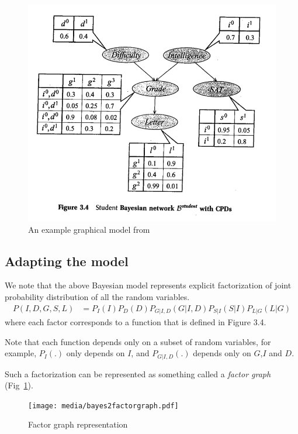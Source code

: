 \documentclass[12pt,oneside,letterpaper]{article}
\begin{document}
\begin{figure}[h]
\includegraphics[width=\textwidth]{media/examplebayesnet.png}
\caption{An example graphical model from \cite[p 53]{koller2009probabilistic}}
\end{figure}

\subsection{Adapting the model}
We note that the above Bayesian model represents explicit factorization of
joint probability distribution of all the random variables.
\begin{align}
  P(I, D, G, S, L) &= P_I(I)P_D(D)P_{G|I,D}(G|I, D)P_{S|I}(S|I)P_{L|G}(L|G)
\end{align}
where each factor corresponds to a function that is defined in Figure 3.4.

Note that each function depends only on a subset of random variables, for
example, $P_I(.)$ only depends on $I$, and $P_{G|I,D}(.)$ depends only on
$G$,$I$ and $D$.

Such a factorization can be represented as something called a \emph{factor
graph} (Fig~\ref{fig:fg2}). 

\begin{figure}
  \centering
  \texttt{[image: media/bayes2factorgraph.pdf]}
  \caption{Factor graph representation}
  \label{fig:fg2}
\end{figure}
\end{document}
